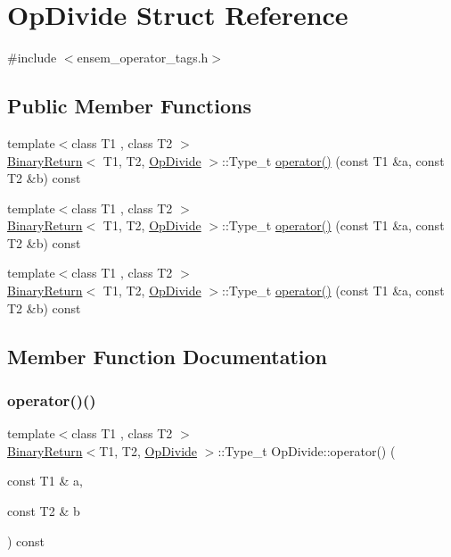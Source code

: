 \hypertarget{structOpDivide}{}\section{Op\+Divide Struct Reference}
\label{structOpDivide}


{\ttfamily \#include $<$ensem\+\_\+operator\+\_\+tags.\+h$>$}

\subsection*{Public Member Functions}
\begin{DoxyCompactItemize}
\item 
{\footnotesize template$<$class T1 , class T2 $>$ }\\\mbox{\hyperlink{structBinaryReturn}{Binary\+Return}}$<$ T1, T2, \mbox{\hyperlink{structOpDivide}{Op\+Divide}} $>$\+::Type\+\_\+t \mbox{\hyperlink{structOpDivide_ae41ed8850cb38437e1b709a890e2fd79}{operator()}} (const T1 \&a, const T2 \&b) const
\item 
{\footnotesize template$<$class T1 , class T2 $>$ }\\\mbox{\hyperlink{structBinaryReturn}{Binary\+Return}}$<$ T1, T2, \mbox{\hyperlink{structOpDivide}{Op\+Divide}} $>$\+::Type\+\_\+t \mbox{\hyperlink{structOpDivide_ae41ed8850cb38437e1b709a890e2fd79}{operator()}} (const T1 \&a, const T2 \&b) const
\item 
{\footnotesize template$<$class T1 , class T2 $>$ }\\\mbox{\hyperlink{structBinaryReturn}{Binary\+Return}}$<$ T1, T2, \mbox{\hyperlink{structOpDivide}{Op\+Divide}} $>$\+::Type\+\_\+t \mbox{\hyperlink{structOpDivide_ae41ed8850cb38437e1b709a890e2fd79}{operator()}} (const T1 \&a, const T2 \&b) const
\end{DoxyCompactItemize}


\subsection{Member Function Documentation}
\mbox{\label{structOpDivide_ae41ed8850cb38437e1b709a890e2fd79}} 
\subsubsection{\texorpdfstring{operator()()}{operator()()}\hspace{0.1cm}{\footnotesize\ttfamily [1/3]}}
{\footnotesize\ttfamily template$<$class T1 , class T2 $>$ \\
\mbox{\hyperlink{structBinaryReturn}{Binary\+Return}}$<$T1, T2, \mbox{\hyperlink{structOpDivide}{Op\+Divide}} $>$\+::Type\+\_\+t Op\+Divide\+::operator() (\begin{DoxyParamCaption}\item[{const T1 \&}]{a,  }\item[{const T2 \&}]{b }\end{DoxyParamCaption}) const\hspace{0.3cm}{\ttfamily [inline]}}

